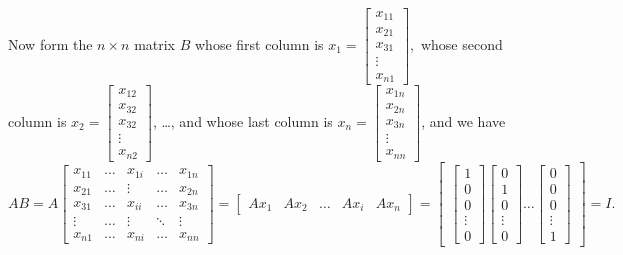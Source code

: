 \documentclass[../main.tex]{subfiles}
\begin{document}
Now form the $n \times n$  matrix  $B$ whose first column is  $x_{1}=\begin{bmatrix}
x_{11} \\
x_{21} \\
x_{31} \\
\vdots \\
x_{n 1}
\end{bmatrix},$  whose second column is  $x_{2}=\begin{bmatrix}
x_{12} \\
x_{32} \\
x_{32} \\
\vdots \\
x_{n 2}
\end{bmatrix}$, \ldots,  and whose last column is $  x_{n}=\begin{bmatrix}x_{1 n} \\ x_{2 n} \\ x_{3 n} \\ \vdots \\ x_{n n}\end{bmatrix}$, and we have
$$
A B = A \begin{bmatrix}
x_{11} & \ldots & x_{1 i} & \ldots & x_{1 n} \\
x_{21} & \ldots & \vdots & \ldots & x_{2 n} \\
x_{31} & \ldots & x_{i i} & \ldots & x_{3 n} \\
\vdots & \ldots & \vdots & \ddots & \vdots \\
x_{n 1} & \ldots & x_{n i} & \ldots & x_{n n}
\end{bmatrix} = \begin{bmatrix}
A x_{1} & A x_{2} & \ldots & A x_{i} & A x_{n}
\end{bmatrix} =\left[\begin{array}{cccc}
\begin{bmatrix}
1 \\ 0 \\ 0 \\ \vdots \\ 0
\end{bmatrix}
\begin{bmatrix}
 0 \\ 1 \\ 0 \\ \vdots \\ 0
\end{bmatrix}
\ldots
\begin{bmatrix}
0 \\ 0 \\ 0 \\ \vdots \\ 1
\end{bmatrix}
\end{array}\right] = I.
$$
\end{document}
